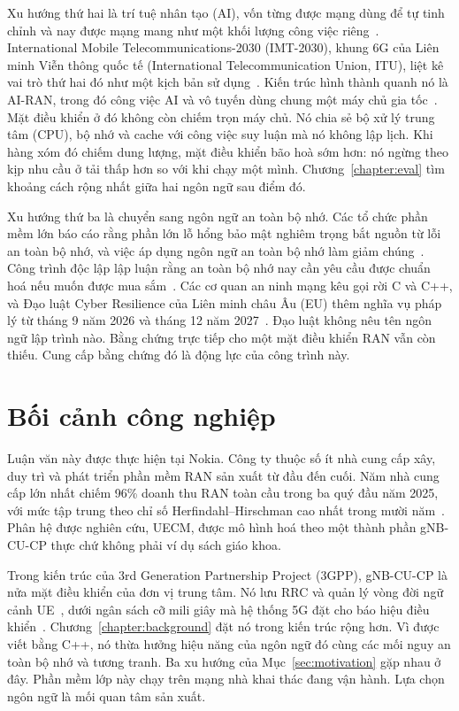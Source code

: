 Xu hướng thứ hai là trí tuệ nhân tạo (AI), vốn từng được mạng dùng để tự tinh chỉnh và nay
được mạng mang như một khối lượng công việc riêng~\cite{polese2026airan}. International
Mobile Telecommunications-2030 (IMT-2030), khung 6G của Liên minh Viễn thông quốc tế
(International Telecommunication Union, ITU), liệt kê vai trò thứ hai đó như một kịch bản sử
dụng~\cite{itu2023imt2030}. Kiến trúc hình thành quanh nó là AI-RAN, trong đó công việc AI và
vô tuyến dùng chung một máy chủ gia tốc~\cite{airan2026orchestrator}. Mặt điều khiển ở đó
không còn chiếm trọn máy chủ. Nó chia sẻ bộ xử lý trung tâm (CPU), bộ nhớ và cache với công
việc suy luận mà nó không lập lịch. Khi hàng xóm đó chiếm dung lượng, mặt điều khiển bão hoà
sớm hơn: nó ngừng theo kịp nhu cầu ở tải thấp hơn so với khi chạy một mình.
Chương~\ref{chapter:eval} tìm khoảng cách rộng nhất giữa hai ngôn ngữ sau điểm đó.

Xu hướng thứ ba là chuyển sang ngôn ngữ an toàn bộ nhớ. Các tổ chức phần mềm lớn báo cáo rằng
phần lớn lỗ hổng bảo mật nghiêm trọng bắt nguồn từ lỗi an toàn bộ nhớ, và việc áp dụng ngôn
ngữ an toàn bộ nhớ làm giảm chúng~\cite{msrc2019memory,google2022android,vanderstoep2025android,google2024securebydesign}.
Công trình độc lập lập luận rằng an toàn bộ nhớ nay cần yêu cầu được chuẩn hoá nếu muốn được
mua sắm~\cite{watson2025memorysafety}. Các cơ quan an ninh mạng kêu gọi rời C và C++, và Đạo
luật Cyber Resilience của Liên minh châu Âu (EU) thêm nghĩa vụ pháp lý từ tháng 9 năm 2026 và
tháng 12 năm 2027~\cite{cisa2023memorysafe,oncd2024building,eu2024cra}. Đạo luật không nêu tên
ngôn ngữ lập trình nào. Bằng chứng trực tiếp cho một mặt điều khiển RAN vẫn còn thiếu. Cung
cấp bằng chứng đó là động lực của công trình này.

\section{Bối cảnh công nghiệp}\label{sec:industrial}
Luận văn này được thực hiện tại Nokia. Công ty thuộc số ít nhà cung cấp xây, duy trì và phát
triển phần mềm RAN sản xuất từ đầu đến cuối. Năm nhà cung cấp lớn nhất chiếm 96\% doanh thu
RAN toàn cầu trong ba quý đầu năm 2025, với mức tập trung theo chỉ số Herfindahl--Hirschman
cao nhất trong mười năm~\cite{delloro2025ran3q,delloro2026ran}. Phân hệ được nghiên cứu, UECM,
được mô hình hoá theo một thành phần gNB-CU-CP thực chứ không phải ví dụ sách giáo khoa.

Trong kiến trúc của 3rd Generation Partnership Project (3GPP), gNB-CU-CP là nửa mặt điều khiển
của đơn vị trung tâm. Nó lưu RRC và quản lý vòng đời ngữ cảnh
UE~\cite{3gpp38401,3gpp38331}, dưới ngân sách cỡ mili giây mà hệ thống 5G đặt cho báo hiệu điều
khiển~\cite{3gpp38913}. Chương~\ref{chapter:background} đặt nó trong kiến trúc rộng hơn. Vì
được viết bằng C++, nó thừa hưởng hiệu năng của ngôn ngữ đó cùng các mối nguy an toàn bộ nhớ
và tương tranh. Ba xu hướng của Mục~\ref{sec:motivation} gặp nhau ở đây. Phần mềm lớp này chạy
trên mạng nhà khai thác đang vận hành. Lựa chọn ngôn ngữ là mối quan tâm sản xuất.

